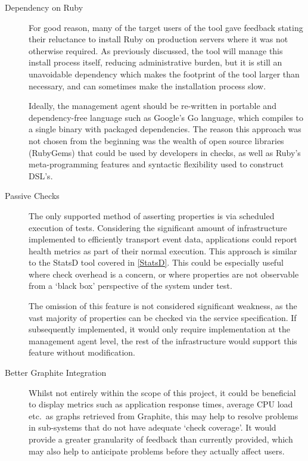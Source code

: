 \documentclass{cshonours}
\begin{document}
\begin{description}
  \item[Dependency on Ruby] For good reason, many of the target users of the tool gave feedback stating their reluctance to install Ruby on production servers where it was not otherwise required. As previously discussed, the tool will manage this install process itself, reducing administrative burden, but it is still an unavoidable dependency which makes the footprint of the tool larger than necessary, and can sometimes make the installation process slow.

    Ideally, the management agent should be re-written in portable and dependency-free language such as Google's Go language, which compiles to a single binary with packaged dependencies. The reason this approach was not chosen from the beginning was the wealth of open source libraries (RubyGems) that could be used by developers in checks, as well as Ruby's meta-programming features and syntactic flexibility used to construct DSL's.

  \item[Passive Checks] The only supported method of asserting properties is via scheduled execution of tests. Considering the significant amount of infrastructure implemented to efficiently transport event data, applications could report health metrics as part of their normal execution. This approach is similar to the StatsD tool covered in \autoref{StatsD}. This could be especially useful where check overhead is a concern, or where properties are not observable from a `black box' perspective of the system under test.

    The omission of this feature is not considered significant weakness, as the vast majority of properties can be checked via the service specification. If subsequently implemented, it would only require implementation at the management agent level, the rest of the infrastructure would support this feature without modification.

  \item[Better Graphite Integration] Whilst not entirely within the scope of this project, it could be beneficial to display metrics such as application response times, average CPU load etc.\ as graphs retrieved from Graphite, this may help to resolve problems in sub-systems that do not have adequate `check coverage'. It would provide a greater granularity of feedback than currently provided, which may also help to anticipate problems before they actually affect users.
\end{description}
\end{document}
